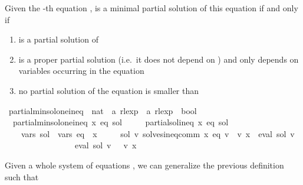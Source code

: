 \begin{isabellebody}
\begin{isamarkuptext}%
Given the -th equation ,  is a minimal partial solution of this equation if and
only if
\begin{enumerate}
  \item {} is a partial solution of 
  \item {} is a proper partial solution (i.e.\ it does not depend on ) and only
    depends on variables occurring in the equation 
  \item no partial solution of the equation  is smaller than 
\end{enumerate}%
\end{isamarkuptext}\isamarkuptrue%
\isamarkupfalse%
\ partial{\isacharunderscore}{\kern0pt}min{\isacharunderscore}{\kern0pt}sol{\isacharunderscore}{\kern0pt}one{\isacharunderscore}{\kern0pt}ineq\ {\isacharcolon}{\kern0pt}{\isacharcolon}{\kern0pt}\ {\isachardoublequoteopen}nat\ {\isasymRightarrow}\ {\isacharprime}{\kern0pt}a\ rlexp\ {\isasymRightarrow}\ {\isacharprime}{\kern0pt}a\ rlexp\ {\isasymRightarrow}\ bool{\isachardoublequoteclose}\ \isanewline
\ \ {\isachardoublequoteopen}partial{\isacharunderscore}{\kern0pt}min{\isacharunderscore}{\kern0pt}sol{\isacharunderscore}{\kern0pt}one{\isacharunderscore}{\kern0pt}ineq\ x\ eq\ sol\ {\isasymequiv}\isanewline
\ \ \ \ partial{\isacharunderscore}{\kern0pt}sol{\isacharunderscore}{\kern0pt}ineq\ x\ eq\ sol\ {\isasymand}\isanewline
\ \ \ \ vars\ sol\ {\isasymsubseteq}\ vars\ eq\ {\isacharminus}{\kern0pt}\ {\isacharbraceleft}{\kern0pt}x{\isacharbraceright}{\kern0pt}\ {\isasymand}\isanewline
\ \ \ \ {\isacharparenleft}{\kern0pt}{\isasymforall}sol{\isacharprime}{\kern0pt}\ v{\isacharprime}{\kern0pt}{\isachardot}{\kern0pt}\ solves{\isacharunderscore}{\kern0pt}ineq{\isacharunderscore}{\kern0pt}comm\ x\ eq\ v{\isacharprime}{\kern0pt}\ {\isasymand}\ v{\isacharprime}{\kern0pt}\ x\ {\isacharequal}{\kern0pt}\ eval\ sol{\isacharprime}{\kern0pt}\ v{\isacharprime}{\kern0pt}\isanewline
\ \ \ \ \ \ \ \ \ \ \ \ \ \ \ {\isasymlongrightarrow}\ {\isasymPsi}\ {\isacharparenleft}{\kern0pt}eval\ sol\ v{\isacharprime}{\kern0pt}{\isacharparenright}{\kern0pt}\ {\isasymsubseteq}\ {\isasymPsi}\ {\isacharparenleft}{\kern0pt}v{\isacharprime}{\kern0pt}\ x{\isacharparenright}{\kern0pt}{\isacharparenright}{\kern0pt}{\isachardoublequoteclose}%
\begin{isamarkuptext}%
Given a whole system of equations , we can generalize the previous definition such that

\end{isamarkuptext}
\end{isabellebody}
